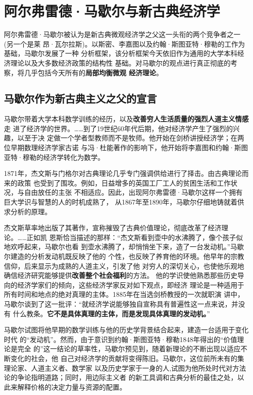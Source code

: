 \chapter{阿尔弗雷德·马歇尔与新古典经济学}

阿尔弗雷德·马歇尔被认为是新古典微观经济学之父这一头衔的两个竞争者之一(另一个是莱
昂·瓦尔拉斯)。以斯密、李嘉图以及约翰·斯图亚特·穆勒的工作为基础，马歇尔发展了一种
分析框架，该分析框架今天依旧作为通用的大学本科经济理论以及大多数经济政策的结构性
基础。对马歇尔的观点进行真正彻底的考察，将几乎包括今天所有的\textbf{局部均衡微观
  经济理论}。

\section{马歇尔作为新古典主义之父的宣言}

马歇尔带着大学本科数学训练的经历，以及\textbf{改善穷人生活质量的强烈人道主义情感}走
进了经济学的世界。……到了19世纪60年代后期，他对经济学产生了强烈的兴趣，以至于决
定做一个学者型教师而不是牧师。他开始在剑桥讲授经济学；在两位早期数理经济学家古诺
与冯·杜能著作的影响下，他开始将李嘉图和约翰·斯图亚特·穆勒的经济学转化为数学。

1871年，杰文斯与门格尔对古典理论几乎专门强调供给进行了择击。由古典理论而来的政策
也受到了围攻。例如，日益增多的英国工厂工人的贫困生活和工作状况，与自由放任的主张
不相适应。因此，出现阿尔弗雷德·马歇尔这样一个拥有巨大学识与智慧的人的时机成熟了，
从1867年至1890年，马歇尔仔细地铸就着供求分析的原理。

杰文斯草率地出版了其著作，宣称摧毁了古典价值理论，彻底改革了经济理论。……正如凯
恩斯恰当描述的那样：“杰文斯看到壶中的水沸腾了，像个孩子似地欢呼起来，马歇尔也看
到壶水沸腾了，却悄悄坐下来，造了一台发动机。”马歇尔建造的分析发动机既反映了他的
个性，也反映了养育他的环境。他早年的宗教信仰，后来显示为成熟的人道主义，引发了他
对穷人的深切关心，也使他乐观地确信经济研究能够提供\textbf{改善整个社会福利}的方法。
他的学识使他熟悉那些历史导向的经济学家们的倾向，这些经济学家反对如下观点，即经济
理论是一种适用于所有时间和地点的绝对真理的主体。1885年在当选剑桥教授的一次就职演
讲中，马歇尔谈到了这一批评：“就经济学说能够独自宣称具有普遍性这一点来说，并没有
什么教条。\textbf{它不是具体真理的主体，而是发现具体真理的发动机。}”

马歇尔试图将他早期的数学训练与他的历史学背景结合起来，建造一台适用于变化时代
的“发动机”。然而，由于意识到约翰·斯图亚特·穆勒1848年得出的“价值理论是完全
的”这一结论的草率性，马歇尔预见到，随着新理论的不断出现以适应不断变化的社会，他
自己对经济学的贡献将变得陈旧。马歇尔，这位前所未有的集理论家、人道主义者、数学家
以及历史学家于一身的人,试图为他所处时代对方法论的争论指明道路；同时，用边际主义者
的新工具调和古典分析的最佳之处，以此来解释价格的决定力量与资源的配置。

